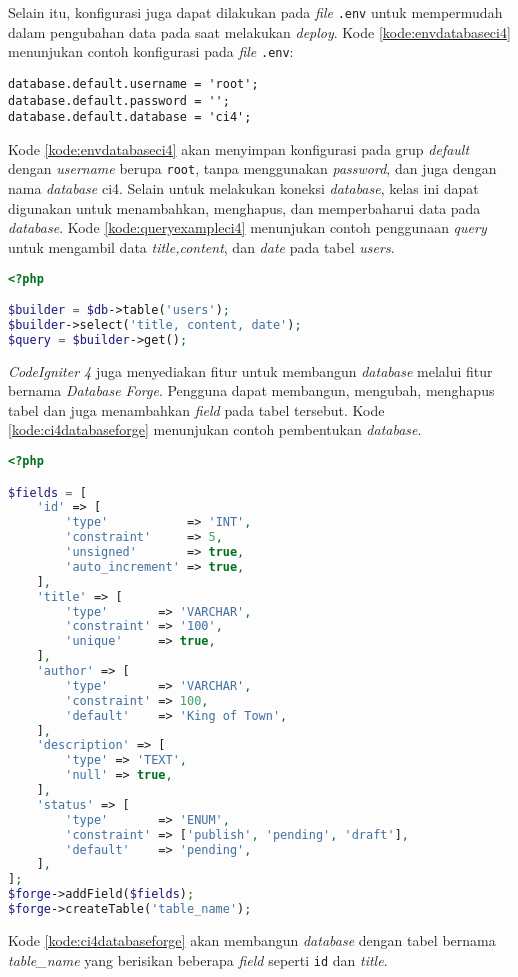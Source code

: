 Selain itu, konfigurasi juga dapat dilakukan pada \textit{file} \texttt{.env} untuk mempermudah dalam pengubahan data pada saat melakukan \textit{deploy}. Kode \ref{kode:envdatabaseci4} menunjukan contoh konfigurasi pada \textit{file} \texttt{.env}:
\begin{lstlisting}[caption=Contoh konfigurasi \textit{database} pada \textit{file} \texttt{.env}. ,label=kode:envdatabaseci4]
database.default.username = 'root';
database.default.password = '';
database.default.database = 'ci4';
\end{lstlisting}

Kode \ref{kode:envdatabaseci4} akan menyimpan konfigurasi pada grup \textit{default} dengan \textit{username} berupa \texttt{root}, tanpa menggunakan \textit{password}, dan juga dengan nama \textit{database} ci4. Selain untuk melakukan koneksi \textit{database}, kelas ini dapat digunakan untuk menambahkan, menghapus, dan memperbaharui data pada \textit{database}. Kode \ref{kode:queryexampleci4} menunjukan contoh penggunaan \textit{query} untuk mengambil data \textit{title,content}, dan \textit{date} pada tabel \textit{users}.

\begin{lstlisting}[language=PHP, caption=Contoh penggunaan \textit{query} menggunakan konfigurasi pada \textit{CodeIgniter 4}. ,label=kode:queryexampleci4]
<?php

$builder = $db->table('users');
$builder->select('title, content, date');
$query = $builder->get();
\end{lstlisting}
\textit{CodeIgniter 4} juga menyediakan fitur untuk membangun \textit{database} melalui fitur bernama \textit{Database Forge}. Pengguna dapat membangun, mengubah, menghapus tabel dan juga menambahkan \textit{field} pada tabel tersebut. Kode \ref{kode:ci4databaseforge} menunjukan contoh pembentukan \textit{database}.
\begin{lstlisting}[language=PHP, caption=Contoh pembentukan tabel melalui \textit{database forge}. ,label=kode:ci4databaseforge]
<?php

$fields = [
    'id' => [
        'type'           => 'INT',
        'constraint'     => 5,
        'unsigned'       => true,
        'auto_increment' => true,
    ],
    'title' => [
        'type'       => 'VARCHAR',
        'constraint' => '100',
        'unique'     => true,
    ],
    'author' => [
        'type'       => 'VARCHAR',
        'constraint' => 100,
        'default'    => 'King of Town',
    ],
    'description' => [
        'type' => 'TEXT',
        'null' => true,
    ],
    'status' => [
        'type'       => 'ENUM',
        'constraint' => ['publish', 'pending', 'draft'],
        'default'    => 'pending',
    ],
];
$forge->addField($fields);
$forge->createTable('table_name');
\end{lstlisting}
Kode \ref{kode:ci4databaseforge} akan membangun \textit{database} dengan tabel bernama \textit{table\_name} yang berisikan beberapa \textit{field} seperti \texttt{id} dan \textit{title}. 

